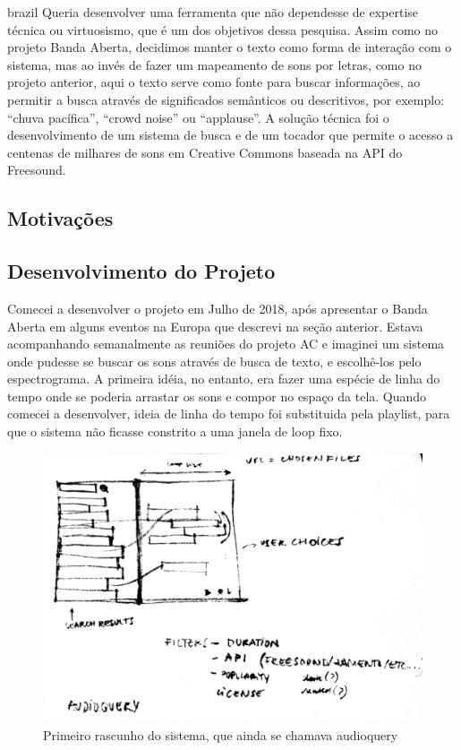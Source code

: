 \begin{otherlanguage*}{brazil}
Queria desenvolver uma ferramenta que não dependesse de expertise técnica ou virtuosismo, que é um dos objetivos dessa pesquisa. Assim como no projeto Banda Aberta, decidimos manter o texto como forma de interação com o sistema, mas ao invés de fazer um mapeamento de sons por letras, como no projeto anterior, aqui o texto serve como fonte para buscar informações, ao permitir a busca através de significados semânticos ou descritivos, por exemplo: ``chuva pacífica'', ``crowd noise'' ou ``applause''. A solução técnica foi o desenvolvimento de um sistema de busca e de um tocador que permite o acesso a centenas de milhares de sons em Creative Commons baseada na API do Freesound.

\subsection{Motivações}




\subsection{Desenvolvimento do Projeto}




Comecei a desenvolver o projeto em Julho de 2018, após apresentar o Banda Aberta em alguns eventos na Europa que descrevi na seção anterior. Estava acompanhando semanalmente as reuniões do projeto AC e imaginei um sistema onde pudesse se buscar os sons através de busca de texto, e escolhê-los pelo espectrograma. A primeira idéia, no entanto, era fazer uma espécie de linha do tempo onde se poderia arrastar os sons e compor no espaço da tela. Quando comecei a desenvolver, ideia de linha do tempo foi substituida pela playlist, para que o sistema não ficasse constrito a uma janela de loop fixo. 

\begin{figure}
\centering
\includegraphics[width=1\textwidth]{pictures/cap4/firstsketch}
\caption{\label{firstsketch}Primeiro rascunho do sistema, que ainda se chamava audioquery}
\label{fig:firstsketch}
\end{figure}



\end{otherlanguage*}
